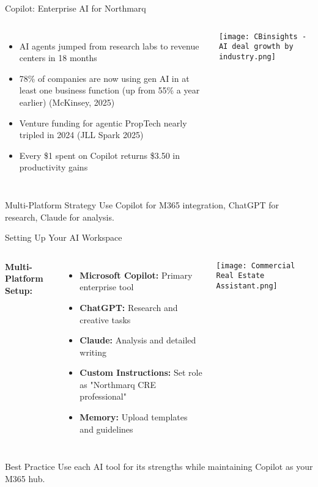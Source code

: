 \documentclass{beamer}
\begin{document}
\begin{frame}{Copilot: Enterprise AI for Northmarq}
  \begin{columns}[T]
  \hspace*{-1.1cm}

{\small
\begin{itemize}
  \setlength\itemsep{1.3em}
  \item AI agents jumped from research labs to revenue centers in 18 months
  \item 78\% of companies are now using gen AI in at least one business function (up from 55\% a year earlier) {\tiny (McKinsey, 2025)}
  \item Venture funding for agentic PropTech nearly tripled in 2024 {\tiny  (JLL Spark 2025)}
  \item Every \$1 spent on Copilot returns \$3.50 in productivity gains
\end{itemize}
}

    \hspace*{-1cm}
  \centering
  \texttt{[image: CBinsights - AI deal growth by industry.png]}\\
  \end{columns}

  \begin{block}{Multi-Platform Strategy}
    Use Copilot for M365 integration, ChatGPT for research, Claude for analysis.
  \end{block}
\end{frame}

\begin{frame}{Setting Up Your AI Workspace}
  \begin{columns}
      \textbf{Multi-Platform Setup:}
      \begin{itemize}
        \item \textbf{Microsoft Copilot:} Primary enterprise tool
        \item \textbf{ChatGPT:} Research and creative tasks
        \item \textbf{Claude:} Analysis and detailed writing
        \item \textbf{Custom Instructions:} Set role as "Northmarq CRE professional"
        \item \textbf{Memory:} Upload templates and guidelines
      \end{itemize}
      \centering
      \texttt{[image: Commercial Real Estate Assistant.png]}
  \end{columns}

  \begin{block}{Best Practice}
    Use each AI tool for its strengths while maintaining Copilot as your M365 hub.
  \end{block}
\end{frame}
\end{document}
